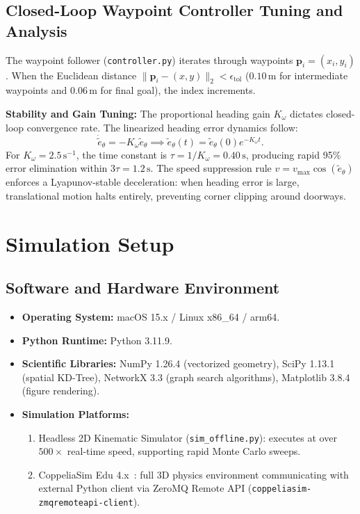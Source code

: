 \documentclass[12pt,a4paper]{article}
\begin{document}
\subsection{Closed-Loop Waypoint Controller Tuning and Analysis}
The waypoint follower (\texttt{controller.py}) iterates through waypoints $\mathbf{p}_i = (x_i, y_i)$. When the Euclidean distance $\|\mathbf{p}_i - (x, y)\|_2 < \epsilon_{\text{tol}}$ ($0.10\,\text{m}$ for intermediate waypoints and $0.06\,\text{m}$ for final goal), the index increments.

\textbf{Stability and Gain Tuning:} The proportional heading gain $K_\omega$ dictates closed-loop convergence rate. The linearized heading error dynamics follow:
\begin{equation}
\dot{\tilde{e}}_\theta = -K_\omega \tilde{e}_\theta \implies \tilde{e}_\theta(t) = \tilde{e}_\theta(0) e^{-K_\omega t}.
\end{equation}
For $K_\omega = 2.5\,\text{s}^{-1}$, the time constant is $\tau = 1/K_\omega = 0.40\,\text{s}$, producing rapid 95\% error elimination within $3\tau = 1.2\,\text{s}$. The speed suppression rule $v = v_{\max} \cos(\tilde{e}_\theta)$ enforces a Lyapunov-stable deceleration: when heading error is large, translational motion halts entirely, preventing corner clipping around doorways.

\section{Simulation Setup}

\subsection{Software and Hardware Environment}
\begin{itemize}[itemsep=2pt,topsep=2pt]
\item \textbf{Operating System:} macOS 15.x / Linux x86\_64 / arm64.
\item \textbf{Python Runtime:} Python 3.11.9.
\item \textbf{Scientific Libraries:} NumPy 1.26.4 (vectorized geometry), SciPy 1.13.1 (spatial KD-Tree), NetworkX 3.3 (graph search algorithms), Matplotlib 3.8.4 (figure rendering).
\item \textbf{Simulation Platforms:} 
  \begin{enumerate}[itemsep=1pt]
  \item Headless 2D Kinematic Simulator (\texttt{sim\_offline.py}): executes at over $500\times$ real-time speed, supporting rapid Monte Carlo sweeps.
  \item CoppeliaSim Edu 4.x~\cite{rohmer2013}: full 3D physics environment communicating with external Python client via ZeroMQ Remote API (\texttt{coppeliasim-zmqremoteapi-client}).
  \end{enumerate}
\end{itemize}
\end{document}
